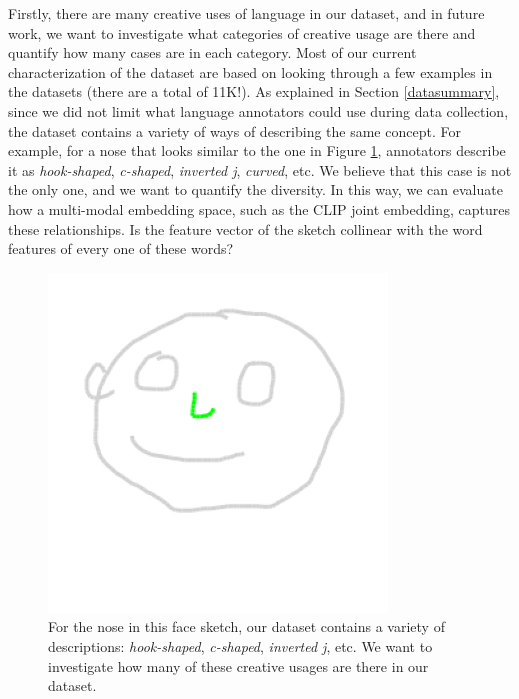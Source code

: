 
Firstly, there are many creative uses of language in our dataset, and in future work, we want to investigate what categories of creative usage are there and quantify how many cases are in each category. 
Most of our current characterization of the dataset are based on looking through a few examples in the datasets (there are a total of 11K!).
As explained in Section \ref{datasummary}, since we did not limit what language annotators could use during data collection, the dataset contains a variety of ways of describing the same concept. For example, for a nose that looks similar to the one in Figure \ref{results.hookNose}, annotators describe it as \textit{hook-shaped}, \textit{c-shaped}, \textit{inverted j}, \textit{curved}, etc. We believe that this case is not the only one, and we want to quantify the diversity. In this way, we can evaluate how a multi-modal embedding space, such as the CLIP joint embedding, captures these relationships. Is the feature vector of the sketch collinear with the word features of every one of these words?          

\begin{figure}[!h]
\centering
\includegraphics[width=0.2\linewidth]{future/future_nose_variety_392.png}  
\caption{For the nose in this face sketch, our dataset contains a variety of descriptions: \textit{hook-shaped}, \textit{c-shaped}, \textit{inverted j}, etc. We want to investigate how many of these creative usages are there in our dataset.}
\label{results.hookNose}
\end{figure}

